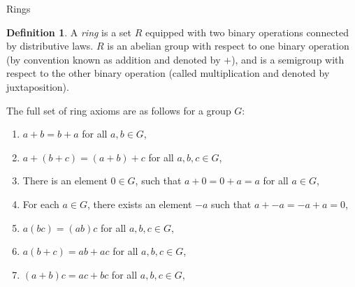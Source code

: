\documentclass{article}
\theoremstyle{definition}
\newtheorem{definition}{Definition}[section]
\begin{document}
\begin{section}{Rings}
  \begin{definition}
    A \emph{ring} is a set $R$ equipped with two binary operations connected by
    distributive laws. $R$ is an abelian group with respect to one binary
    operation (by convention known as addition and denoted by $+$), and is a
    semigroup with respect to the other binary operation (called multiplication
    and denoted by juxtaposition).

    The full set of ring axioms are as follows for a group $G$:
    \begin{enumerate}
        \item
          $ a + b = b + a $ for all $ a, b \in G$,
        \item
          $ a + (b + c) = (a + b) + c $ for all $ a, b, c \in G$,
        \item
          There is an element $0 \in G$, such that
          $a + 0 = 0 + a = a$ for all $a \in G$,
        \item
          For each $a \in G$, there exists an element $-a$ such that
          $a + -a = -a + a = 0$,

        \item
          $ a(bc) = (ab)c $ for all $ a, b, c \in G$,

        \item
          $ a(b+c) = ab + ac $ for all $ a, b, c \in G$,
        \item
          $ (a+b)c = ac + bc $ for all $ a, b, c \in G$,

    \end{enumerate}
  \end{definition}

\end{section}
\end{document}
